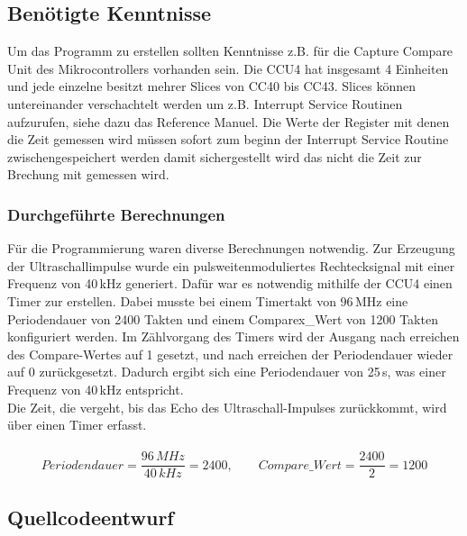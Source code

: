 \subsection{Benötigte Kenntnisse}
Um das Programm zu erstellen sollten Kenntnisse z.B. für die Capture Compare Unit des Mikrocontrollers vorhanden sein. Die CCU4 hat insgesamt 4 Einheiten und jede einzelne besitzt mehrer Slices von CC40 bis CC43. Slices können untereinander verschachtelt werden um z.B. Interrupt Service Routinen aufzurufen, siehe dazu das Reference Manuel.
Die Werte der Register mit denen die Zeit gemessen wird müssen sofort zum beginn der Interrupt Service Routine zwischengespeichert werden damit sichergestellt wird das nicht die Zeit zur Brechung mit gemessen wird.\\

\subsubsection{Durchgeführte Berechnungen}
Für die Programmierung waren diverse Berechnungen notwendig. Zur Erzeugung der Ultraschallimpulse wurde ein pulsweitenmoduliertes Rechtecksignal mit einer Frequenz von 40\,kHz generiert. Dafür war es notwendig mithilfe der CCU4 einen Timer zur erstellen. Dabei musste bei einem Timertakt von 96\,MHz eine Periodendauer von 2400 Takten und einem Comparex\_Wert von 1200 Takten konfiguriert werden. Im Zählvorgang des Timers wird der Ausgang nach erreichen des Compare-Wertes auf 1 gesetzt, und nach erreichen der Periodendauer wieder auf 0 zurückgesetzt. Dadurch ergibt sich eine Periodendauer von 25\,\textmu s, was einer Frequenz von 40\,kHz entspricht.\\
Die Zeit, die vergeht, bis das Echo des Ultraschall-Impulses zurückkommt, wird über einen Timer erfasst. 
\onehalfspacing \\ \\
\[\displaystyle Periodendauer=\frac{96\,MHz}{40\,kHz} = 2400,\qquad	 Compare\_Wert=\frac{2400}{2} = 1200 \] 
\singlespacing


\subsection{Quellcodeentwurf}

